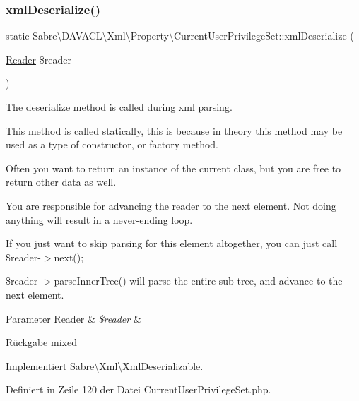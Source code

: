 \subsubsection{\texorpdfstring{xml\+Deserialize()}{xmlDeserialize()}}
{\footnotesize\ttfamily static Sabre\textbackslash{}\+D\+A\+V\+A\+C\+L\textbackslash{}\+Xml\textbackslash{}\+Property\textbackslash{}\+Current\+User\+Privilege\+Set\+::xml\+Deserialize (\begin{DoxyParamCaption}\item[{\mbox{\hyperlink{class_sabre_1_1_xml_1_1_reader}{Reader}}}]{\$reader }\end{DoxyParamCaption})\hspace{0.3cm}{\ttfamily [static]}}

The deserialize method is called during xml parsing.

This method is called statically, this is because in theory this method may be used as a type of constructor, or factory method.

Often you want to return an instance of the current class, but you are free to return other data as well.

You are responsible for advancing the reader to the next element. Not doing anything will result in a never-\/ending loop.

If you just want to skip parsing for this element altogether, you can just call \$reader-\/$>$next();

\$reader-\/$>$parse\+Inner\+Tree() will parse the entire sub-\/tree, and advance to the next element.


\begin{DoxyParams}[1]{Parameter}
Reader & {\em \$reader} & \\
\hline
\end{DoxyParams}
\begin{DoxyReturn}{Rückgabe}
mixed 
\end{DoxyReturn}


Implementiert \mbox{\hyperlink{interface_sabre_1_1_xml_1_1_xml_deserializable_a19e0eca545b9a0d93f7d6b69085ade30}{Sabre\textbackslash{}\+Xml\textbackslash{}\+Xml\+Deserializable}}.



Definiert in Zeile 120 der Datei Current\+User\+Privilege\+Set.\+php.

\mbox{\label{class_sabre_1_1_d_a_v_a_c_l_1_1_xml_1_1_property_1_1_current_user_privilege_set_a1a60129813a1acc5aebfb260306df9b5}} 
